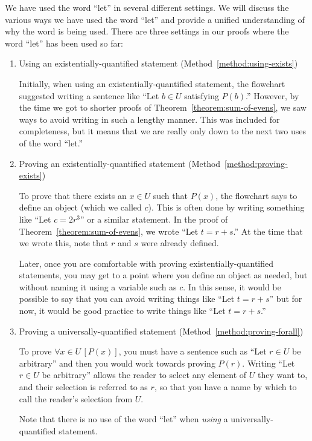 \documentclass{book}
\theoremstyle{ekimcustom}
\begin{document}
We have used the word ``let'' in several different settings. We will discuss the various ways we have used the word ``let'' and provide a unified understanding of why the word is being used. There are three settings in our proofs where the word ``let'' has been used so far:
\begin{enumerate}
\item Using an existentially-quantified statement (Method~\ref{method:using-exists})

Initially, when using an existentially-quantified statement, the flowchart suggested writing a sentence like ``Let $b \in U$ satisfying $P(b)$.'' However, by the time we got to shorter proofs of Theorem~\ref{theorem:sum-of-evens}, we saw ways to avoid writing in such a lengthy manner. This was included for completeness, but it means that we are really only down to the next two uses of the word ``let.''

\item Proving an existentially-quantified statement (Method~\ref{method:proving-exists})

To prove that there exists an $x \in U$ such that $P(x)$, the flowchart says to define an object (which we called $c$). This is often done by writing something like ``Let $c=2r^3$'' or a similar statement. In the proof of Theorem~\ref{theorem:sum-of-evens}, we wrote ``Let $t=r+s$.'' At the time that we wrote this, note that $r$ and $s$ were already defined.

Later, once you are comfortable with proving existentially-quantified statements, you may get to a point where you define an object as needed, but without naming it using a variable such as $c$. In this sense, it would be possible to say that you can avoid writing things like ``Let $t =r+s$'' but for now, it would be good practice to write things like ``Let $t=r+s$.''

\item Proving a universally-quantified statement (Method~\ref{method:proving-forall})

To prove $\forall x \in U\, [P(x)]$, you must have a sentence such as ``Let $r \in U$ be arbitrary'' and then you would work towards proving $P(r)$. Writing ``Let $r \in U$ be arbitrary'' allows the reader to select any element of $U$ they want to, and their selection is referred to as $r$, so that you have a name by which to call the reader's selection from $U$.

Note that there is no use of the word ``let'' when \emph{using} a universally-quantified statement.
\end{enumerate}
\end{document}
